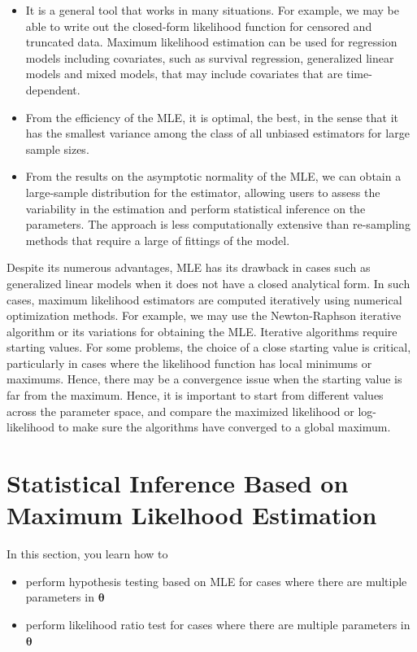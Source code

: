\documentclass[]{book}
\providecommand{\tightlist}{%
  \setlength{\itemsep}{0pt}\setlength{\parskip}{0pt}}
\theoremstyle{definition}
\theoremstyle{definition}
\theoremstyle{definition}
\theoremstyle{remark}
\begin{document}
\begin{itemize}
\tightlist
\item
  It is a general tool that works in many situations. For example, we
  may be able to write out the closed-form likelihood function for
  censored and truncated data. Maximum likelihood estimation can be used
  for regression models including covariates, such as survival
  regression, generalized linear models and mixed models, that may
  include covariates that are time-dependent.
\item
  From the efficiency of the MLE, it is optimal, the best, in the sense
  that it has the smallest variance among the class of all unbiased
  estimators for large sample sizes.
\item
  From the results on the asymptotic normality of the MLE, we can obtain
  a large-sample distribution for the estimator, allowing users to
  assess the variability in the estimation and perform statistical
  inference on the parameters. The approach is less computationally
  extensive than re-sampling methods that require a large of fittings of
  the model.
\end{itemize}

Despite its numerous advantages, MLE has its drawback in cases such as
generalized linear models when it does not have a closed analytical
form. In such cases, maximum likelihood estimators are computed
iteratively using numerical optimization methods. For example, we may
use the Newton-Raphson iterative algorithm or its variations for
obtaining the MLE. Iterative algorithms require starting values. For
some problems, the choice of a close starting value is critical,
particularly in cases where the likelihood function has local minimums
or maximums. Hence, there may be a convergence issue when the starting
value is far from the maximum. Hence, it is important to start from
different values across the parameter space, and compare the maximized
likelihood or log-likelihood to make sure the algorithms have converged
to a global maximum.

\section{Statistical Inference Based on Maximum Likelhood
Estimation}\label{S:TS2b:SI}

In this section, you learn how to

\begin{itemize}
\tightlist
\item
  perform hypothesis testing based on MLE for cases where there are
  multiple parameters in \(\boldsymbol\theta\)
\item
  perform likelihood ratio test for cases where there are multiple
  parameters in \(\boldsymbol\theta\)
\end{itemize}
\end{document}
